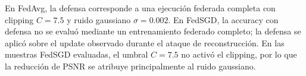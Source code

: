 \begin{table}[H]
\centering
\caption{Comparación final entre FedAvg y FedSGD en términos de utilidad, reconstrucción e inferencia de etiquetas.}
\label{tab:fedavg_fedsgd_privacy_utility}
\end{table}

\noindent
En FedAvg, la defensa corresponde a una ejecución federada completa con clipping $C=7.5$ y ruido gaussiano $\sigma=0.002$. En FedSGD, la accuracy con defensa no se evaluó mediante un entrenamiento federado completo; la defensa se aplicó sobre el update observado durante el ataque de reconstrucción. En las muestras FedSGD evaluadas, el umbral $C=7.5$ no activó el clipping, por lo que la reducción de PSNR se atribuye principalmente al ruido gaussiano.
